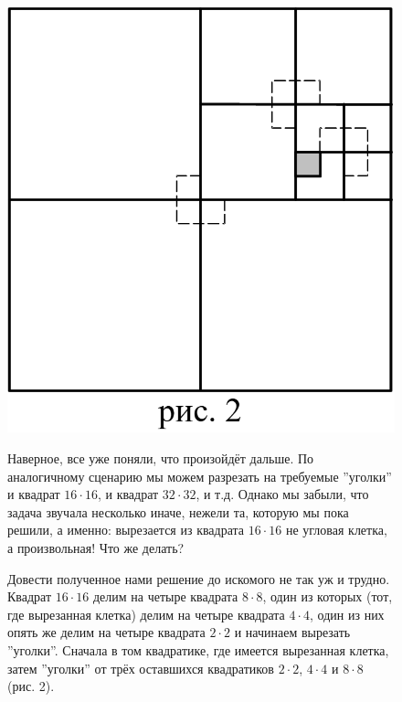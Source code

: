 {\setlength{\intextsep}{2pt}
\begin{figure}[h]
\begin{minipage}{0.27\linewidth}
    \includegraphics[scale=0.15]{./img/kvadrat2}
\end{minipage}
\hfill
\begin{minipage}{0.72\linewidth}\setlength{\parindent}{1.5em}
    Наверное, все уже поняли, что произойдёт дальше. По аналогичному сценарию мы можем разрезать на требуемые ''уголки'' и квадрат $16 \cdot 16$, и квадрат $32 \cdot 32$, и т.д. Однако мы забыли, что задача звучала несколько иначе, нежели та, которую мы пока решили, а именно: вырезается из квадрата $16 \cdot 16$ не угловая клетка, а произвольная! Что же делать? 
    \par 
    Довести полученное нами решение до искомого не так уж и трудно. Квадрат $16 \cdot 16$ делим на четыре квадрата $8 \cdot 8$, один из которых (тот, где вырезанная клетка) делим на четыре квадрата $4 \cdot 4$, один из них опять же делим на четыре квадрата $2 \cdot 2$ и начинаем вырезать ''уголки''. Сначала в том квадратике, где имеется вырезанная клетка, затем ''уголки'' от трёх
оставшихся квадратиков $2 \cdot 2$, $4 \cdot 4$ и $8 \cdot 8$ (рис. 2). 
\end{minipage}
\end{figure}}


